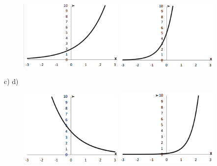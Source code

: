 \begin{respostas}{3}
\begin{figure}[H]
    \includegraphics[width=0.45\textwidth]{capitulos/potencias_e_funcoes_exponenciais/media/image33.png} 
    \includegraphics[width=0.45\textwidth]{capitulos/potencias_e_funcoes_exponenciais/media/image34.png}
\end{figure}

c) \tab d)

\begin{figure}[H]
    \includegraphics[width=0.45\textwidth]{capitulos/potencias_e_funcoes_exponenciais/media/image35.png} 
    \includegraphics[width=0.45\textwidth]{capitulos/potencias_e_funcoes_exponenciais/media/image36.png}
\end{figure}



\end{respostas}
